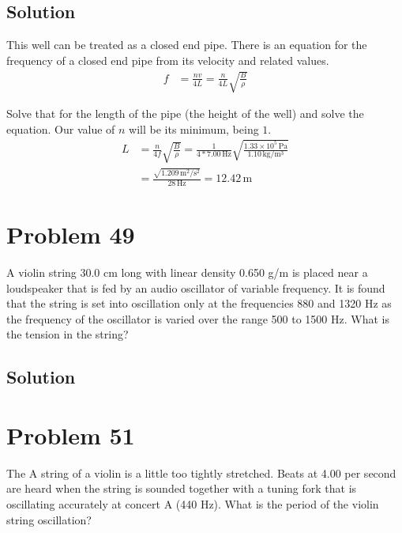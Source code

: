 \documentclass[12pt]{article}
\newcommand{\E}[1]{\times 10^{#1}}
\begin{document}
        \subsection{Solution}
            This well can be treated as a closed end pipe.
            There is an equation for the frequency of a closed end pipe from its velocity and related values.
            \begin{align}
                f   &=  \frac{nv}{4L}
                    =   \frac{n}{4L} \sqrt{\frac{B}{\rho}}
            \end{align}

            Solve that for the length of the pipe (the height of the well) and solve the equation.
            Our value of $n$ will be its minimum, being $1$.
            \begin{align}
                L   &=  \frac{n}{4f} \sqrt{\frac{B}{\rho}}
                    =   \frac{1}{4*7.00\,\unit{\hertz}} \sqrt{\frac{1.33\E{5}\,\unit{\pascal}}{1.10\,\unit{\kilo\gram/\meter^3}}}\\
                    &=  \frac{\sqrt{1.209\,\unit{\meter^2/\second^2}}}{28\,\unit{\hertz}}
                    =   \boxed{12.42\,\unit{\meter}}
            \end{align}

    \pagebreak
    \section{Problem 49}
        A violin string 30.0 cm long with linear density 0.650 g/m is placed near a loudspeaker that is fed by an audio oscillator of variable frequency. 
        It is found that the string is set into oscillation only at the frequencies 880 and 1320 Hz as the frequency of the oscillator is varied over the range 500 to 1500 Hz.
        What is the tension in the string?

        \subsection{Solution}

    \pagebreak
    \section{Problem 51}
        The A string of a violin is a little too tightly stretched. 
        Beats at 4.00 per second are heard when the string is sounded together with a tuning fork that is oscillating accurately at concert A (440 Hz).
        What is the period of the violin string oscillation?
\end{document}
